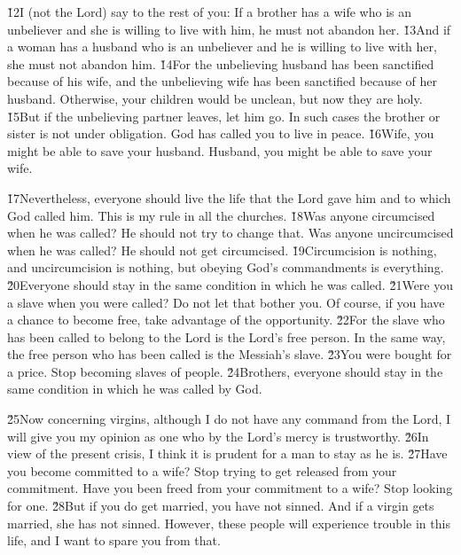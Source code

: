 \v{12}I (not the Lord) say to the rest of you: If a brother has a wife who is an unbeliever and she is willing to live with him, he must not abandon her. \v{13}And if a woman has a husband who is an unbeliever and he is willing to live with her, she must not abandon him. \v{14}For the unbelieving husband has been sanctified because of his wife, and the unbelieving wife has been sanctified because of her husband. Otherwise, your children would be unclean, but now they are holy. \v{15}But if the unbelieving partner leaves, let him go. In such cases the brother or sister is not under obligation. God has called you to live in peace. \v{16}Wife, you might be able to save your husband. Husband, you might be able to save your wife.

\v{17}Nevertheless, everyone should live the life that the Lord gave him and to which God called him. This is my rule in all the churches. \v{18}Was anyone circumcised when he was called? He should not try to change that. Was anyone uncircumcised when he was called? He should not get circumcised. \v{19}Circumcision is nothing, and uncircumcision is nothing, but obeying God's commandments is everything. \v{20}Everyone should stay in the same condition in which he was called. \v{21}Were you a slave when you were called? Do not let that bother you. Of course, if you have a chance to become free, take advantage of the opportunity. \v{22}For the slave who has been called to belong to the Lord is the Lord's free person. In the same way, the free person who has been called is the Messiah's slave. \v{23}You were bought for a price. Stop becoming slaves of people. \v{24}Brothers, everyone should stay in the same condition in which he was called by God.

\v{25}Now concerning virgins, although I do not have any command from the Lord, I will give you my opinion as one who by the Lord's mercy is trustworthy. \v{26}In view of the present crisis, I think it is prudent for a man to stay as he is. \v{27}Have you become committed to a wife? Stop trying to get released from your commitment. Have you been freed from your commitment to a wife? Stop looking for one. \v{28}But if you do get married, you have not sinned. And if a virgin gets married, she has not sinned. However, these people will experience trouble in this life, and I want to spare you from that.

